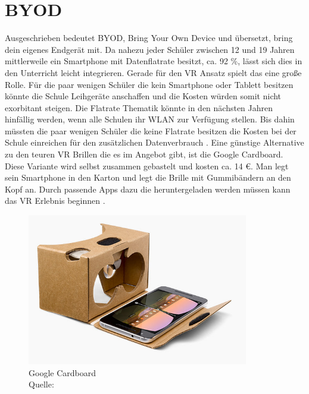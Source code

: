 \section{BYOD}
Ausgeschrieben bedeutet BYOD, Bring Your Own Device und übersetzt, bring dein eigenes Endgerät mit. Da nahezu jeder Schüler zwischen 12 und 19 Jahren mittlerweile ein Smartphone mit Datenflatrate besitzt, ca. 92 \%, lässt sich dies in den Unterricht leicht integrieren. Gerade für den VR Ansatz spielt das eine große Rolle. Für die paar wenigen Schüler die kein Smartphone oder Tablett besitzen könnte die Schule Leihgeräte anschaffen und die Kosten würden somit nicht exorbitant steigen. Die Flatrate Thematik könnte in den nächsten Jahren hinfällig werden, wenn alle Schulen ihr WLAN zur Verfügung stellen. Bis dahin müssten die paar wenigen Schüler die keine Flatrate besitzen die Kosten bei der Schule einreichen für den zusätzlichen Datenverbrauch \cite[vgl.][]{Cardboard1}. 
Eine günstige Alternative zu den teuren VR Brillen die es im Angebot gibt, ist die Google Cardboard. Diese Variante wird selbst zusammen gebastelt und kosten ca. 14 \euro{}. Man legt sein Smartphone in den Karton und legt die Brille mit Gummibändern an den Kopf an. Durch passende Apps dazu die heruntergeladen werden müssen kann das VR Erlebnis beginnen \cite[vgl.][]{Cardboard2}.

\begin{figure}[ht]
	\centering
	\includegraphics[width=\textwidth,height=\textheight,keepaspectratio]{images/GoogleCarboard.png}
	\caption{Google Cardboard  \\ Quelle: \cite[vgl.][]{Cardboard2}}
	\label{Google Cardboard}
\end{figure}

